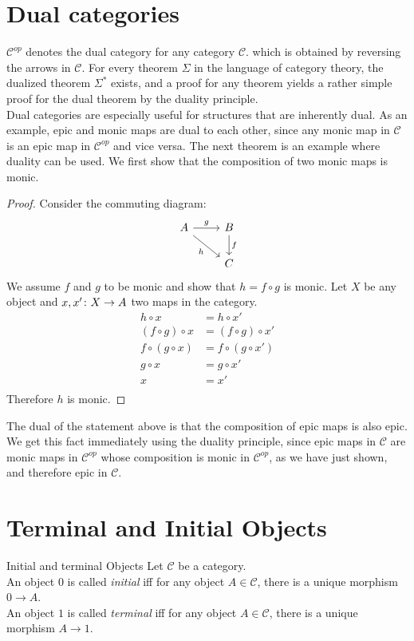 \section {Dual categories}

$\mathscr{C}^{op}$ denotes the dual category for any category $\mathscr{C}$.
which is obtained by reversing the arrows in $\mathscr{C}$.
For every theorem $\Sigma$ in the language of category theory,
the dualized theorem $\Sigma^*$ exists,
and a proof for any theorem yields a rather simple proof for the dual theorem by the duality principle.\\
Dual categories are especially useful for structures that are inherently dual.
As an example, epic and monic maps are dual to each other, since any monic map in $\mathscr{C}$
is an epic map in $\mathscr{C}^{op}$ and vice versa.
The next theorem is an example where duality can be used.
We first show that the composition of two monic maps is monic.
\begin{proof}
  Consider the commuting diagram:
  \[
    \begin{tikzcd}
      A \arrow[dr, swap, "h"] \arrow{r}{g} & B \arrow{d}{f} \\
      & C
    \end{tikzcd}
  \]
  We assume $f$ and $g$ to be monic and show that $h = f \circ g $ is monic.
  Let $X$ be any object and $x, x' \from X \to A$ two maps in the category.
  \begin{align*}
    h \circ x &= h \circ x' \\
    (f \circ g) \circ x &= (f \circ g) \circ x' \\
    f \circ (g \circ x) &= f \circ (g \circ x') \\
    g \circ x &= g \circ x' \\
    x &= x' \\
  \end{align*}
  Therefore $h$ is monic.
\end{proof}
The dual of the statement above is that the composition of epic maps is also epic.
We get this fact immediately using the duality principle, since epic maps in $\mathscr{C}$
are monic maps in $\mathscr{C}^{op}$ whose composition is monic in $\mathscr{C}^{op}$, as we
have just shown, and therefore epic in $\mathscr{C}$.

\section {Terminal and Initial Objects}
\begin {definition}{Initial and terminal Objects}
  Let $\mathscr{C}$ be a category.\\
  An object $0$ is called \emph{initial}  iff for any object $A \in \mathscr{C}$,
  there is a unique morphism $0 \to A$.\\
  An object $1$ is called \emph{terminal} iff for any object $A \in \mathscr{C}$,
  there is a unique morphism $A \to 1$.
\end {definition}

